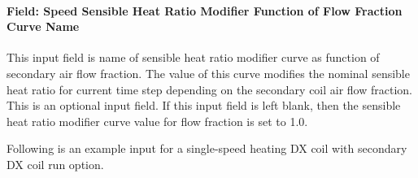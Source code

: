 \paragraph{Field: Speed Sensible Heat Ratio Modifier Function of Flow Fraction Curve Name}\label{field-speed-sensible-heat-ratio-modifier-function-of-flow-fraction-curve-name}

This input field is name of sensible heat ratio modifier curve as function of secondary air flow fraction. The value of this curve modifies the nominal sensible heat ratio for current time step depending on the secondary coil air flow fraction. This is an optional input field. If this input field is left blank, then the sensible heat ratio modifier curve value for flow fraction is set to 1.0.

Following is an example input for a single-speed heating DX coil with secondary DX coil run option.

